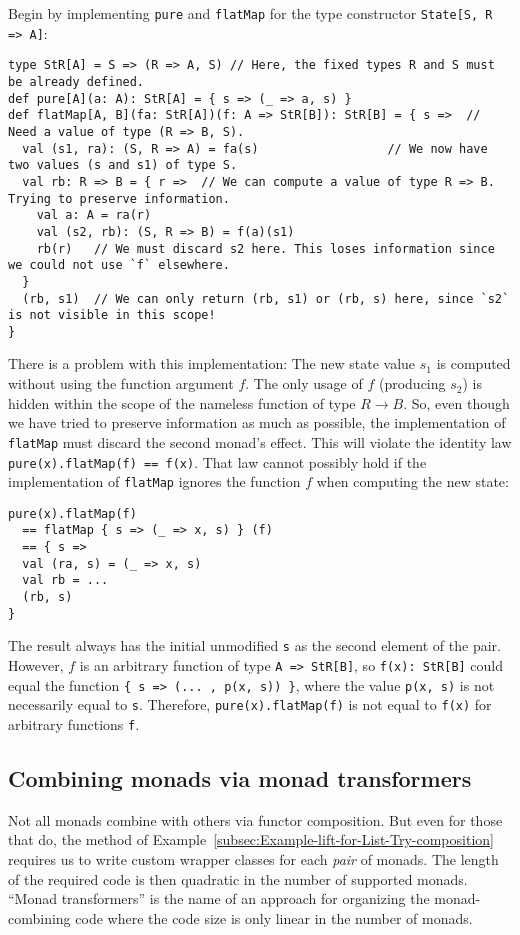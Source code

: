 Begin by implementing \lstinline!pure! and \lstinline!flatMap! for
the type constructor \lstinline!State[S, R => A]!:
\begin{lstlisting}
type StR[A] = S => (R => A, S) // Here, the fixed types R and S must be already defined.
def pure[A](a: A): StR[A] = { s => (_ => a, s) }
def flatMap[A, B](fa: StR[A])(f: A => StR[B]): StR[B] = { s =>  // Need a value of type (R => B, S).
  val (s1, ra): (S, R => A) = fa(s)                  // We now have two values (s and s1) of type S.
  val rb: R => B = { r =>  // We can compute a value of type R => B. Trying to preserve information.
    val a: A = ra(r)
    val (s2, rb): (S, R => B) = f(a)(s1)
    rb(r)   // We must discard s2 here. This loses information since we could not use `f` elsewhere.
  }
  (rb, s1)  // We can only return (rb, s1) or (rb, s) here, since `s2` is not visible in this scope!
}
\end{lstlisting}
There is a problem with this implementation: The new state value $s_{1}$
is computed without using the function argument $f$. The only usage
of $f$ (producing $s_{2}$) is hidden within the scope of the nameless
function of type $R\rightarrow B$. So, even though we have tried
to preserve information as much as possible, the implementation of
\lstinline!flatMap! must discard the second monad\textsf{'}s effect. This
will violate the identity law \lstinline!pure(x).flatMap(f) == f(x)!.
That law cannot possibly hold if the implementation of \lstinline!flatMap!
ignores the function $f$ when computing the new state:
\begin{lstlisting}
pure(x).flatMap(f)
  == flatMap { s => (_ => x, s) } (f)
  == { s =>
  val (ra, s) = (_ => x, s)
  val rb = ...
  (rb, s)
}
\end{lstlisting}
The result always has the initial unmodified \lstinline!s! as the
second element of the pair. However, $f$ is an arbitrary function
of type \lstinline!A => StR[B]!, so \lstinline!f(x): StR[B]! could
equal the function \lstinline!{ s => (... , p(x, s)) }!, where the
value \lstinline!p(x, s)! is not necessarily equal to \lstinline!s!.
Therefore, \lstinline!pure(x).flatMap(f)! is not equal to \lstinline!f(x)!
for arbitrary functions \lstinline!f!.

\subsection{Combining monads via monad transformers}

Not all monads combine with others via functor composition. But even
for those that do, the method of Example~\ref{subsec:Example-lift-for-List-Try-composition}
requires us to write custom wrapper classes for each\emph{ pair} of
monads. The length of the required code is then quadratic in the number
of supported monads. \textsf{``}Monad transformers\textsf{''} is the name of an approach
for organizing the monad-combining code where the code size is only
linear in the number of monads.

